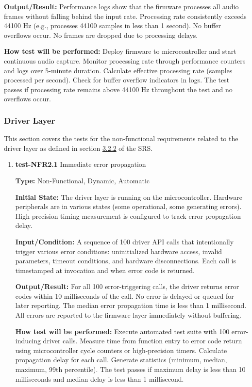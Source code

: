 \documentclass[12pt, titlepage]{article}
\begin{document}
\begin{enumerate}
\textbf{Output/Result:} 
Performance logs show that the firmware processes all audio frames without falling 
behind the input rate. Processing rate consistently exceeds 44100 Hz (e.g., 
processes 44100 samples in less than 1 second). No buffer overflows occur. No 
frames are dropped due to processing delays.
					
\textbf{How test will be performed:} 
Deploy firmware to microcontroller and start continuous audio capture. Monitor 
processing rate through performance counters and logs over 5-minute duration. 
Calculate effective processing rate (samples processed per second). Check for 
buffer overflow indicators in logs. The test passes if processing rate remains 
above 44100 Hz throughout the test and no overflows occur.

\end{enumerate}

\subsubsection{Driver Layer}

This section covers the tests for the non-functional requirements related to the 
driver layer as defined in section \hyperref[SRS-sec:FR2]{3.2.2} of the SRS.

\begin{enumerate}

\item{\textbf{test-NFR2.1} Immediate error propagation\\}

\textbf{Type:} Non-Functional, Dynamic, Automatic
					
\textbf{Initial State:} 
The driver layer is running on the microcontroller. Hardware peripherals are in 
various states (some operational, some generating errors). High-precision timing 
measurement is configured to track error propagation delay.
					
\textbf{Input/Condition:} 
A sequence of 100 driver API calls that intentionally trigger various error 
conditions: uninitialized hardware access, invalid parameters, timeout conditions, 
and hardware disconnections. Each call is timestamped at invocation and when 
error code is returned.
					
\textbf{Output/Result:} 
For all 100 error-triggering calls, the driver returns error codes within 10 
milliseconds of the call. No error is delayed or queued for later reporting. 
The median error propagation time is less than 1 millisecond. All errors are 
reported to the firmware layer immediately without buffering.
					
\textbf{How test will be performed:} 
Execute automated test suite with 100 error-inducing driver calls. Measure time 
from function entry to error code return using microcontroller cycle counters or 
high-precision timers. Calculate propagation delay for each call. Generate 
statistics (minimum, median, maximum, 99th percentile). The test passes if maximum 
delay is less than 10 milliseconds and median delay is less than 1 millisecond.

\end{enumerate}
		
\end{document}
